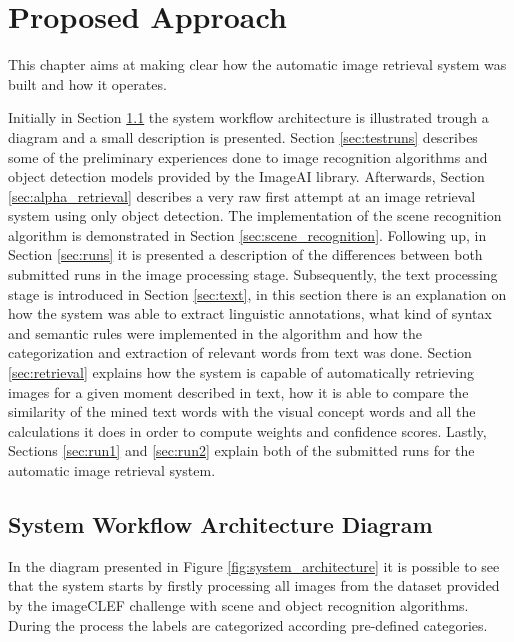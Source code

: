 \cleardoublepage

\chapter{Proposed Approach}
\label{ch:initial_work}

This chapter aims at making clear how the automatic image retrieval system was built and how it operates.



Initially in Section \ref{sec:diagram} the system workflow architecture is illustrated trough a diagram and a small description is presented. Section \ref{sec:testruns} describes some of the preliminary experiences done to image recognition algorithms and object detection models provided by the ImageAI library. Afterwards, Section \ref{sec:alpha_retrieval} describes a very raw first attempt at an image retrieval system using only object detection. The implementation of the scene recognition algorithm is demonstrated in Section \ref{sec:scene_recognition}. Following up, in Section \ref{sec:runs} it is presented a description of the differences between both submitted runs in the image processing stage. Subsequently, the text processing stage is introduced in Section \ref{sec:text}, in this section there is an explanation on how the system was able to extract linguistic annotations, what kind of syntax and semantic rules were implemented in the algorithm and how the categorization and extraction of relevant words from text was done. Section \ref{sec:retrieval} explains how the system is capable of automatically retrieving images for a given moment described in text, how it is able to compare the similarity of the mined text words with the visual concept words and all the calculations it does in order to compute weights and confidence scores. Lastly, Sections \ref{sec:run1} and \ref{sec:run2} explain both of the submitted runs for the automatic image retrieval system. 



\section{System Workflow Architecture Diagram}
\label{sec:diagram}
In the diagram presented in Figure \ref{fig:system_architecture} it is possible to see that the system starts by firstly processing all images from the dataset provided by the imageCLEF challenge with scene and object recognition algorithms. During the process the labels are categorized according pre-defined categories.

